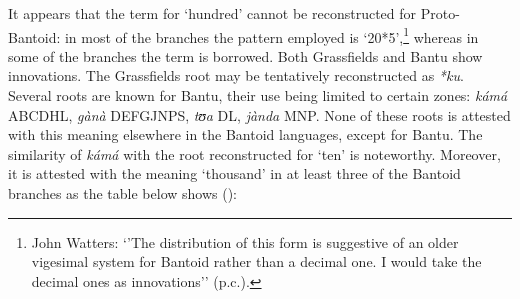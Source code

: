 It appears that the term for `hundred' cannot be reconstructed for Proto-Bantoid: in most of the branches the pattern employed is ‘20*5’,\footnote{John Watters: ‘’The distribution of this form is suggestive of an older vigesimal system for Bantoid rather than a decimal one. I would take the decimal ones as innovations’’ (p.c.).} whereas in some of the branches the term is borrowed. Both Grassfields and Bantu show innovations. The Grassfields root may be tentatively reconstructed as \textit{*ku}. Several roots are known for Bantu, their use being limited to certain zones: \textit{kámá} ABCDHL, \textit{gànà} DEFGJNPS, \textit{tʊa} DL, \textit{jànda} MNP. None of these roots is attested with this meaning elsewhere in the Bantoid languages, except for Bantu. The similarity of \textit{kámá} with the root reconstructed for `ten' is noteworthy. Moreover, it is attested with the meaning `thousand' in at least three of the Bantoid branches as the table below shows ():

